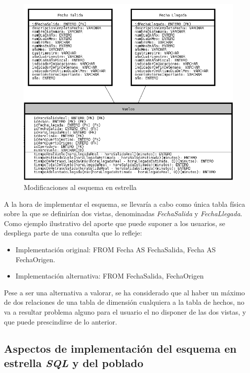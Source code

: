 \documentclass{article}
\begin{document}
\begin{figure}[hbpt]
    \centering
    \includegraphics[scale=0.4]{images/fechas.png}
    \caption{Modificaciones al esquema en estrella}
    \label{fig:esquema_estrella_opcional}
\end{figure}

A la hora de implementar el esquema, se llevaría a cabo como única tabla física sobre la que se definirían dos vistas, denominadas \textit{FechaSalida} y \textit{FechaLlegada}.\\
Como ejemplo ilustrativo del aporte que puede suponer a los usuarios, se despliega parte de una consulta que lo refleje:

\begin{itemize}
    \item Implementación original: FROM Fecha AS FechaSalida, Fecha AS FechaOrigen.
    \item Implementación alternativa: FROM FechaSalida, FechaOrigen
\end{itemize}

Pese a ser una alternativa a valorar, se ha considerado que al haber un máximo de dos relaciones de una tabla de dimensión cualquiera a la tabla de hechos, no va a resultar problema alguno para el usuario el no disponer de las dos vistas, y que puede prescindirse de lo anterior.

\subsection{Aspectos de implementación del esquema en estrella \textit{SQL} y del poblado}
\end{document}

